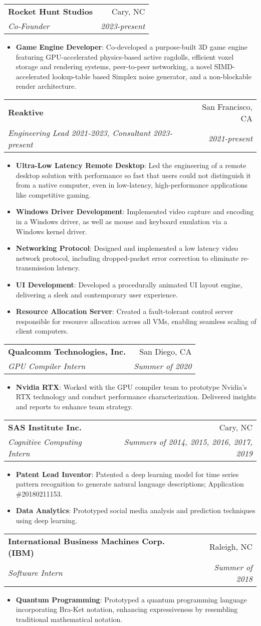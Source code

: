 \documentclass[letterpaper,11pt]{article}
\makeatletter
\newcommand{\resumeItem}[2]{
  \item\small{
    \textbf{#1}{: #2 \vspace{-2pt}}
  }
}
\newcommand{\resumeSubheading}[4]{
  \vspace{-1pt}\item
    \begin{tabular*}{0.97\textwidth}{l@{\extracolsep{\fill}}r}
      \textbf{#1} & #2 \\
      \textit{\small#3} & \textit{\small #4} \\
    \end{tabular*}\vspace{-5pt}
}
\newcommand{\resumeItemListStart}{\begin{itemize}}
\newcommand{\resumeItemListEnd}{\end{itemize}\vspace{-5pt}}
\makeatother
\begin{document}
\resumeSubheading
{Rocket Hunt Studios}{Cary, NC}
{Co-Founder}{2023-present}
\resumeItemListStart
\resumeItem{Game Engine Developer}{Co-developed a purpose-built 3D game engine featuring GPU-accelerated physics-based active ragdolls, efficient voxel storage and rendering systems, peer-to-peer networking, a novel SIMD-accelerated lookup-table based Simplex noise generator, and a non-blockable render architecture.}
\resumeItemListEnd

\resumeSubheading
{Reaktive}{San Francisco, CA}
{Engineering Lead 2021-2023, Consultant 2023-present}{2021-present}
\resumeItemListStart
\resumeItem{Ultra-Low Latency Remote Desktop}{Led the engineering of a remote desktop solution with performance so fast that users could not distinguish it from a native computer, even in low-latency, high-performance applications like competitive gaming.}
\resumeItem{Windows Driver Development}{Implemented video capture and encoding in a Windows driver, as well as mouse and keyboard emulation via a Windows kernel driver.}
\resumeItem{Networking Protocol}{Designed and implemented a low latency video network protocol, including dropped-packet error correction to eliminate re-transmission latency.}
\resumeItem{UI Development}{Developed a procedurally animated UI layout engine, delivering a sleek and contemporary user experience.}
\resumeItem{Resource Allocation Server}{Created a fault-tolerant control server responsible for resource allocation across all VMs, enabling seamless scaling of client computers.}
\resumeItemListEnd

\resumeSubheading
{Qualcomm Technologies, Inc.}{San Diego, CA}
{GPU Compiler Intern}{Summer of 2020}
\resumeItemListStart
\resumeItem{Nvidia RTX}{Worked with the GPU compiler team to prototype Nvidia's RTX technology and conduct performance characterization. Delivered insights and reports to enhance team strategy.}
\resumeItemListEnd

\resumeSubheading
{SAS Institute Inc.}{Cary, NC}
{Cognitive Computing Intern}{Summers of 2014, 2015, 2016, 2017, 2019}
\resumeItemListStart
\resumeItem{Patent Lead Inventor}{Patented a deep learning model for time series pattern recognition to generate natural language descriptions; Application \#20180211153.}
\resumeItem{Data Analytics}{Prototyped social media analysis and prediction techniques using deep learning.}
\resumeItemListEnd

\resumeSubheading
{International Business Machines Corp. (IBM)}{Raleigh, NC}
{Software Intern}{Summer of 2018}
\resumeItemListStart
\resumeItem{Quantum Programming}{Prototyped a quantum programming language incorporating Bra-Ket notation, enhancing expressiveness by resembling traditional mathematical notation.}
\resumeItemListEnd
\end{document}
